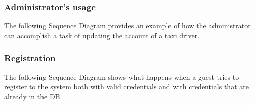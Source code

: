 \documentclass{article}
\begin{document}
	\subsubsection{Administrator's usage}
	The following Sequence Diagram provides an example of how the administrator can accomplish a task of updating the account of a taxi driver.
	\begin{figure}[H]
	\end{figure}
	\subsubsection{Registration}
	The following Sequence Diagram shows what happens when a guest tries to register to the system both with valid credentials and with credentials that are already in the DB\@.
	\begin{figure}[H]
	\end{figure}
\end{document}
